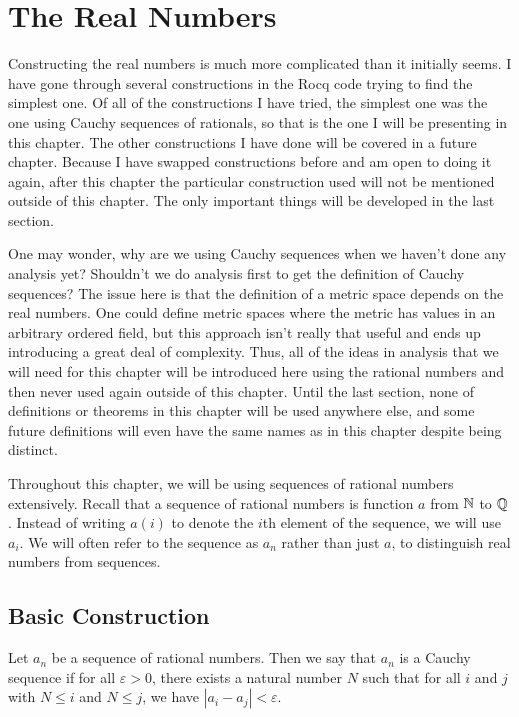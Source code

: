 \documentclass[../../math.tex]{subfiles}
\begin{document}
\setcounter{chapter}{10}

\chapter{The Real Numbers}

Constructing the real numbers is much more complicated than it initially seems.
I have gone through several constructions in the Rocq code trying to find the
simplest one.  Of all of the constructions I have tried, the simplest one was
the one using Cauchy sequences of rationals, so that is the one I will be
presenting in this chapter.  The other constructions I have done will be covered
in a future chapter.  Because I have swapped constructions before and am open to
doing it again, after this chapter the particular construction used will not be
mentioned outside of this chapter.  The only important things will be developed
in the last section.

One may wonder, why are we using Cauchy sequences when we haven't done any
analysis yet?  Shouldn't we do analysis first to get the definition of Cauchy
sequences?  The issue here is that the definition of a metric space depends on
the real numbers.  One could define metric spaces where the metric has values in
an arbitrary ordered field, but this approach isn't really that useful and ends
up introducing a great deal of complexity.  Thus, all of the ideas in analysis
that we will need for this chapter will be introduced here using the rational
numbers and then never used again outside of this chapter.  Until the last
section, none of definitions or theorems in this chapter will be used anywhere
else, and some future definitions will even have the same names as in this
chapter despite being distinct.

Throughout this chapter, we will be using sequences of rational numbers
extensively.  Recall that a sequence of rational numbers is function $a$ from
$\mathbb{N}$ to $\mathbb{Q}$.  Instead of writing $a(i)$ to denote the $i$th element of the
sequence, we will use $a_i$.  We will often refer to the sequence as $a_n$
rather than just $a$, to distinguish real numbers from sequences.

\section{Basic Construction}

\begin{definition}
    Let $a_n$ be a sequence of rational numbers.  Then we say that $a_n$ is a
    Cauchy sequence if for all $\varepsilon > 0$, there exists a natural number
    $N$ such that for all $i$ and $j$ with $N \leq i$ and $N \leq j$, we have
    $|a_i - a_j| < \varepsilon$.
\end{definition}
\end{document}
